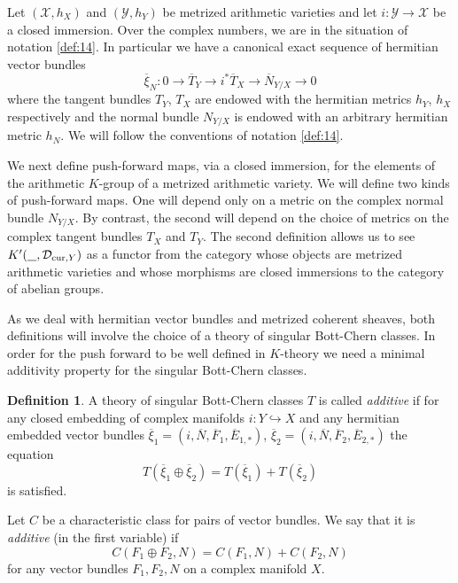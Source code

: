 \documentclass[10pt,twoside]{article}
\numberwithin{equation}{section}
\theoremstyle{plain}
\theoremstyle{definition}
\newtheorem{definition}[equation]{Definition}
\newcommand{\D}{\text{{\rm cur}}}
\begin{document}
Let $(\mathcal{X},h_X)$ and $(\mathcal{Y},h_Y)$ be metrized
arithmetic varieties and let $i\colon \mathcal{Y}\longrightarrow
\mathcal{X}$  be a closed immersion. Over the complex numbers, we are
in the situation of notation \ref{def:14}. In particular we have a
canonical exact 
sequence of 
hermitian vector bundles
\begin{equation}
  \label{eq:90}
\overline{\xi}_N \colon  0\longrightarrow
\overline{T}_{Y}\longrightarrow i^*\overline{T}_{X} \longrightarrow
\overline{N}_{Y/X} \longrightarrow 0  
\end{equation}
where the tangent bundles
$T_{Y}$, $T_{X}$ are endowed with the hermitian metrics $h_Y$, $h_X$
respectively and the normal bundle $N_{Y/X}$ is endowed with an
arbitrary hermitian metric $h_{N}$. We will follow the conventions of
notation \ref{def:14}.

We next define push-forward maps, via a closed immersion, for
the elements of the arithmetic $K$-group of a metrized arithmetic
variety.
 We will define two kinds of push-forward maps. One will
depend only on a metric on the complex normal bundle $N_{Y/X}$. By
contrast, the 
second will depend on the choice of metrics on the complex tangent
bundles $T_{X}$ and $T_{Y}$. The second definition allows us to see
$K'(\underline {\phantom{A}},\mathcal{D}_{\D,Y})$ as a functor from
the category whose objects are  metrized arithmetic varieties and
whose morphisms are closed immersions to the category of abelian
groups.   

 As we deal with hermitian vector bundles and metrized coherent
sheaves, both definitions will involve the choice of a theory of
singular Bott-Chern classes. In order for the push forward to be well
defined in $K$-theory we need a minimal additivity property for the
singular Bott-Chern classes. 


\begin{definition}\label{defadtheory}
A theory of singular Bott-Chern classes $T$ is called
\emph{additive} if for any closed embedding of complex manifolds
$i\colon Y\hookrightarrow X$ and any hermitian embedded vector bundles
$\overline{\xi}_1=(i,\overline{N},\overline{F}_1,\overline{E}_{1,\ast})$,
$\overline{\xi}_2=(i,\overline{N},\overline{F}_2,\overline{E}_{2,\ast})$
the equation
$$T(\overline{\xi}_1\oplus
\overline{\xi}_2)=T(\overline{\xi}_1)+T(\overline{\xi}_2)$$
is satisfied.

Let $C$ be a characteristic class for pairs of vector bundles. We
say that it is \emph{additive} (in the first variable) if
$$C(F_1\oplus F_2,N)=C(F_1,N)+C(F_2,N)$$
for any vector bundles $F_1,F_2,N$ on a complex manifold $X$.
\end{definition}
\end{document}

